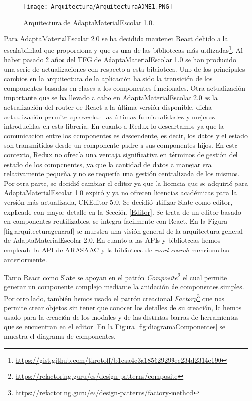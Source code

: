 \begin{figure}[ht!]
  \centering
  \texttt{[image: Arquitectura/ArquitecturaADME1.PNG]}
  \caption{Arquitectura de AdaptaMaterialEscolar 1.0.
  }
  \label{arquitecturaADME1}
\end{figure}

Para AdaptaMaterialEscolar 2.0 se ha decidido mantener React debido a la escalabilidad que proporciona y que es una de las bibliotecas más utilizadas\footnote{\url{https://gist.github.com/tkrotoff/b1caa4c3a185629299ec234d2314e190}}. Al haber pasado 2 años del TFG de AdaptaMaterialEscolar 1.0 se han producido una serie de actualizaciones con respecto a esta biblioteca. Uno de los principales cambios en la arquitectura de la aplicación ha sido la transición de los componentes basados en clases a los componentes funcionales. Otra actualización importante que se ha llevado a cabo en AdaptaMaterialEscolar 2.0 es la actualización del router de React a la última versión disponible, dicha actualización  permite aprovechar las últimas funcionalidades y mejoras introducidas en esta librería. En cuanto a Redux lo descartamos ya que la comunicación entre los componentes es descendente, es decir, los datos y el estado son transmitidos desde un componente padre a sus componentes hijos. En este contexto, Redux no ofrecía una ventaja significativa en términos de gestión del estado de los componentes, ya que la cantidad de datos a manejar era relativamente pequeña y no se requería una gestión centralizada de los mismos. Por otra parte, se decidió cambiar el editor ya que la licencia que se adquirió para AdaptaMaterialEscolar 1.0 expiró y ya no ofrecen licencias académicas para la versión más actualizada, CKEditor 5.0. Se decidió utilizar Slate como editor, explicado con mayor detalle en la Sección \ref{Editor}. Se trata de un editor basado en componentes reutilizables, se integra facilmente con React. En la Figura \ref{fig:arquitecturageneral} se muestra una visión general de la arquitectura general de AdaptaMaterialEscolar 2.0. En cuanto a las APIs y bibliotecas hemos empleado la API de ARASAAC y la biblioteca de \textit{word-search} mencionadas anteriormente.

Tanto React como Slate se apoyan en el patrón \textit{Composite}\footnote{\url{https://refactoring.guru/es/design-patterns/composite}} el cual permite generar un componente complejo mediante la anidación de componentes simples. Por otro lado, también hemos usado el patrón creacional \textit{Factory}\footnote{\url{https://refactoring.guru/es/design-patterns/factory-method}} que nos permite crear objetos sin tener que conocer los detalles de su creación, lo hemos usado para la creación de los modales y de las distintas barras de herramientas que se encuentran en el editor. En la Figura \ref{fig:diagramaComponentes} se muestra el diagrama de componentes.

